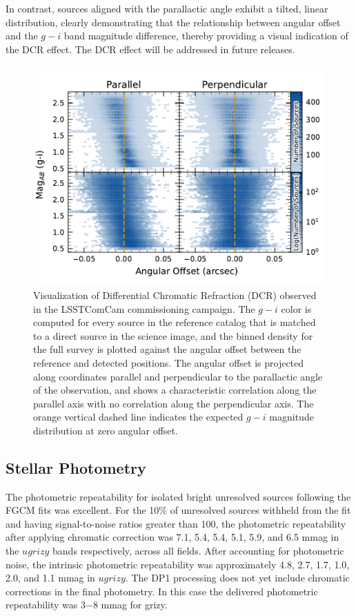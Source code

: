 In contrast, sources aligned with the parallactic angle exhibit a tilted, linear distribution, clearly demonstrating that the relationship between angular offset and the $g-i$ band magnitude difference, thereby providing a visual indication of the \gls{DCR} effect.
The DCR effect will be addressed in future releases. 

\begin{figure}[htb!]
\includegraphics[width=\linewidth]{dcrHexbin}
\caption{Visualization of \gls{Differential Chromatic Refraction} (DCR) observed in the LSSTComCam commissioning campaign. The $g-i$ color is computed for every source in the reference catalog that is matched to a direct source in the science image, and the binned density for the full survey is plotted against the angular offset between the reference and detected positions. The angular offset is projected along coordinates parallel and perpendicular to the parallactic angle of the observation, and shows a characteristic correlation along the parallel axis with no correlation along the perpendicular axis. The orange vertical dashed line indicates the expected $g-i$ magnitude distribution at zero angular offset.}
\label{fig:dcr}
\end{figure}

\subsection{Stellar Photometry}
The photometric repeatability for isolated bright unresolved sources following the \gls{FGCM} fits was excellent. 
For the 10\% of unresolved sources withheld from the fit and having signal-to-noise ratios greater than 100, the photometric repeatability 
after applying chromatic correction was 7.1, 5.4, 5.4, 5.1, 5.9, and 6.5  mmag in the $ugrizy$ bands respectively, across all fields.
After accounting for photometric noise, the intrinsic photometric repeatability was approximately 4.8, 2.7, 1.7, 1.0, 2.0, and 1.1 mmag in $ugrizy$.
The DP1 processing does not yet include chromatic corrections in the final photometry. 
In this case  the delivered photometric repeatability was 3−8 mmag  for grizy.  

